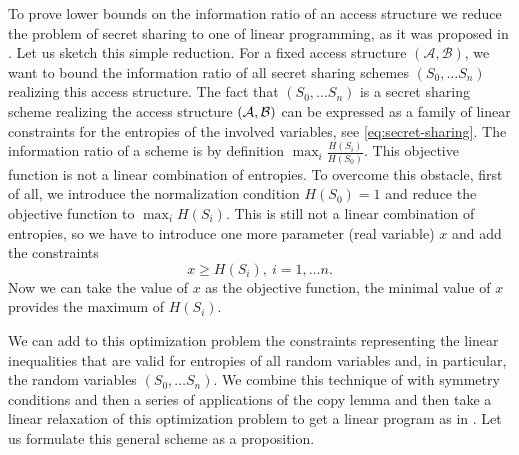 \documentclass[11pt, a4paper]{kybernetika}
\begin{document}
	To prove lower bounds on the information ratio of an access structure we reduce the problem of secret sharing to one of linear programming, as it was proposed in \cite{padro2013finding}.
	Let us sketch this simple reduction. For a fixed access structure $(\mathcal{A},\mathcal{B})$, we want to bound the information ratio of all secret sharing schemes $(S_0,\ldots S_n)$ realizing this access structure. The fact that $(S_0,\ldots S_n)$ is a secret sharing scheme realizing the access structure $({\cal A}, {\cal B})$ can be expressed as a family of linear constraints for the entropies of the involved variables, see \eqref{eq:secret-sharing}. The information ratio of a scheme is by definition $\max_i \frac{H(S_i)}{H(S_0)}$.	This objective function is not a linear combination of entropies. To overcome this obstacle, first of all, we introduce the normalization condition $H(S_0)=1$ and reduce the objective function to $\max_i H(S_i)$. This is still not a linear combination of entropies, so we have to introduce one more parameter (real variable) $x$ and add the constraints
	$$
	x\ge H(S_i),\ i=1,\ldots n.
	$$
	Now we can take the value of $x$ as the objective function, the minimal value of $x$ provides the maximum of $H(S_i)$.
	
	We can add to this optimization problem the constraints representing the linear inequalities that are valid for entropies of all random variables and, in particular, the random variables $(S_0,\ldots S_n)$.
	We combine this technique of \cite{padro2013finding} with symmetry conditions and then a series of applications of the copy lemma and then take a linear relaxation of this optimization problem to get a linear program as in \cite{gurpinar2019use}.  
	Let us formulate this general scheme as a proposition.
	
\end{document}
